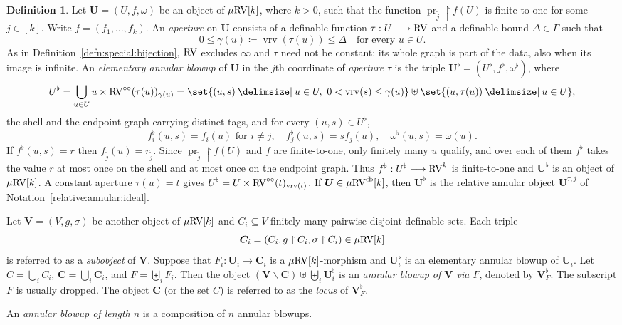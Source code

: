 \documentclass[12pt]{amsart}
\newcommand{\memph}[1]{{\color{magenta}\emph{#1}}}
\theoremstyle{plain}
\theoremstyle{definition}
\newtheorem{defn}[thm]{Definition}
\theoremstyle{remark}
\numberwithin{equation}{section}
\theoremstyle{plain}
\newcommand{\RV}{\textup{RV}}
\DeclareMathOperator{\pr}{pr}
\newcommand{\0}{\emptyset}
\newcommand{\rest}{\upharpoonright}
\newcommand{\fun}{\longrightarrow}
\newcommand{\sub}{\subseteq}
\newcommand{\mi}{\smallsetminus}
\providecommand\given{}
\newcommand\SetSymbol[1][]{%
\nonscript \: #1 \vert
\allowbreak
\nonscript\:
\mathopen{}}
\renewcommand\given{\SetSymbol[\delimsize]}
\newcommand{\mRV}{{\mu}{\RV}}
\DeclareMathOperator{\vrv}{vrv}
\DeclareMathOperator{\db}{d \! b}
\newcommand{\ccirc}{\circ \circ}
\begin{document}
\begin{defn}\label{defn:blowup:coa}
Let $\bm U = (U, f, \omega)$ be an object of $\mRV[k]$, where $k > 0$, such that the function $\pr_{\tilde j} \rest f(U)$ is finite-to-one for some $j \in [k]$. Write $f = (f_1, \ldots, f_k)$. An \memph{aperture} on $\bm U$ consists of a definable function $\tau : U \fun \RV$ and a definable bound $\Delta \in \Gamma$ such that
\[
0 \leq \gamma(u) \coloneqq \vrv(\tau(u)) \leq \Delta \quad \text{for every } u \in U.
\]
As in Definition~\ref{defn:special:bijection}, $\RV$ excludes $\infty$ and $\tau$ need not be constant; its whole graph is part of the data, also when its image is infinite. An \memph{elementary annular blowup} of $\bm U$ in the $j$th coordinate of \memph{aperture} $\tau$ is the triple $\bm U^{\flat} = (U^{\flat}, f^{\flat}, \omega^\flat)$, where
\[
U^{\flat} = \bigcup_{u \in U} u \times \RV^{\ccirc}(\tau(u))_{\gamma(u)} = \set{(u, s) \given u \in U,\ 0 < \vrv(s) \leq \gamma(u)} \uplus \set{(u, \tau(u)) \given u \in U},
\]
the shell and the endpoint graph carrying distinct tags, and for every $(u, s) \in U^{\flat}$,
\[
f^{\flat}_{i}(u, s) = f_{i}(u) \text{ for } i \neq j, \quad f^{\flat}_{j}(u, s) = s f_{j}(u), \quad \omega^\flat(u, s) = \omega(u).
\]
If $f^\flat(u, s) = r$ then $f_{\tilde j}(u) = r_{\tilde j}$. Since $\pr_{\tilde j} \rest f(U)$ and $f$ are finite-to-one, only finitely many $u$ qualify, and over each of them $f^\flat$ takes the value $r$ at most once on the shell and at most once on the endpoint graph. Thus $f^\flat : U^\flat \fun \RV^k$ is finite-to-one and $\bm U^\flat$ is an object of $\mRV[k]$. A constant aperture $\tau(u) = t$ gives $U^\flat = U \times \RV^{\ccirc}(t)_{\vrv(t)}$. If $\bm U \in \mRV^{\db}[k]$, then $\bm U^\flat$ is the relative annular object $\bm U^{\tau, j}$ of Notation~\ref{relative:annular:ideal}.


Let $\bm V = (V, g, \sigma)$ be another object of $\mRV[k]$ and $C_i \sub V$ finitely many pairwise disjoint definable sets. Each triple
\[
\bm C_i = (C_i, g \rest C_i, \sigma \rest C_i) \in \mRV[k]
\]
is referred to as a \memph{subobject} of $\bm V$. Suppose that $F_i : \bm U_i \fun \bm C_i$ is a $\mRV[k]$-morphism and $\bm U^{\flat}_i$ is an elementary annular blowup of $\bm U_i$. Let $C = \bigcup_i C_i$, $\bm C = \bigcup_i \bm C_i$,  and $F = \biguplus_i F_i$. Then the object
$
 (\bm V \mi \bm C) \uplus \biguplus_i \bm U_i^{\flat}
$
is  an \memph{annular blowup of $\bm V$ via $F$}, denoted by $\bm V^{\flat}_F$. The subscript $F$ is usually dropped. The object $\bm C$ (or the set $C$) is referred to as the \memph{locus} of $\bm V^{\flat}_F$.

An \memph{annular blowup of length $n$} is a composition of $n$ annular blowups.
\end{defn}
\end{document}
